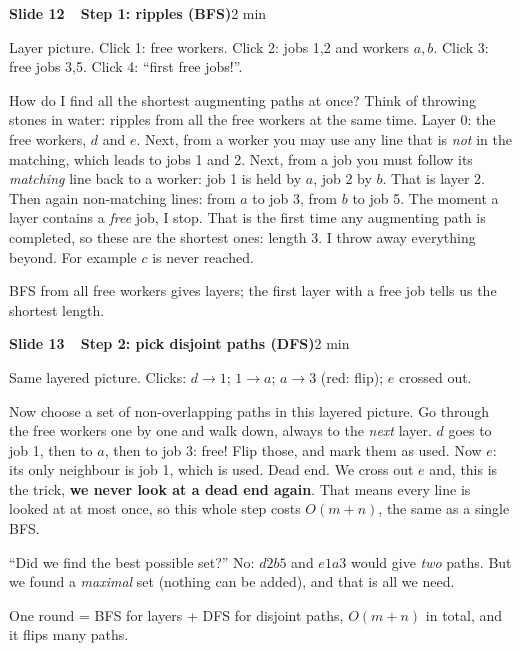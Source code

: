 \documentclass[11pt,a4paper]{article}
\newcommand{\slidehead}[3]{%
  \Needspace{9\baselineskip}\vspace{4pt}\noindent\colorbox{hkblue!12}{\parbox{\dimexpr\linewidth-2\fboxsep}{%
  \textbf{\color{hkblue}Slide #1\ \ #2}\hfill{\small\color{hkgrey}#3}}}\par\vspace{2pt}}
\begin{document}
\slidehead{12}{Step 1: ripples (BFS)}{2 min}
\begin{onscreen}
Layer picture. Click 1: free workers. Click 2: jobs 1,2 and workers $a,b$. Click 3: free jobs 3,5. Click 4: ``first free jobs!''.
\end{onscreen}
\begin{say}
How do I find all the shortest augmenting paths at once? Think of throwing stones in water: ripples from all the free workers at the same time. Layer 0: the free workers, $d$ and $e$. Next, from a worker you may use any line that is \emph{not} in the matching, which leads to jobs 1 and 2. Next, from a job you must follow its \emph{matching} line back to a worker: job 1 is held by $a$, job 2 by $b$. That is layer 2. Then again non-matching lines: from $a$ to job 3, from $b$ to job 5. The moment a layer contains a \emph{free} job, I stop. That is the first time any augmenting path is completed, so these are the shortest ones: length 3. I throw away everything beyond. For example $c$ is never reached.
\end{say}
\begin{key}BFS from all free workers gives layers; the first layer with a free job tells us the shortest length.\end{key}

\slidehead{13}{Step 2: pick disjoint paths (DFS)}{2 min}
\begin{onscreen}
Same layered picture. Clicks: $d\to1$; $1\to a$; $a\to3$ (red: flip); $e$ crossed out.
\end{onscreen}
\begin{say}
Now choose a set of non-overlapping paths in this layered picture. Go through the free workers one by one and walk down, always to the \emph{next} layer. $d$ goes to job 1, then to $a$, then to job 3: free! Flip those, and mark them as used. Now $e$: its only neighbour is job 1, which is used. Dead end. We cross out $e$ and, this is the trick, \textbf{we never look at a dead end again}. That means every line is looked at at most once, so this whole step costs $O(m+n)$, the same as a single BFS.
\end{say}
\begin{ask}
``Did we find the best possible set?'' No: $d2b5$ and $e1a3$ would give \emph{two} paths. But we found a \emph{maximal} set (nothing can be added), and that is all we need.
\end{ask}
\begin{key}One round = BFS for layers + DFS for disjoint paths, $O(m+n)$ in total, and it flips many paths.\end{key}
\end{document}
